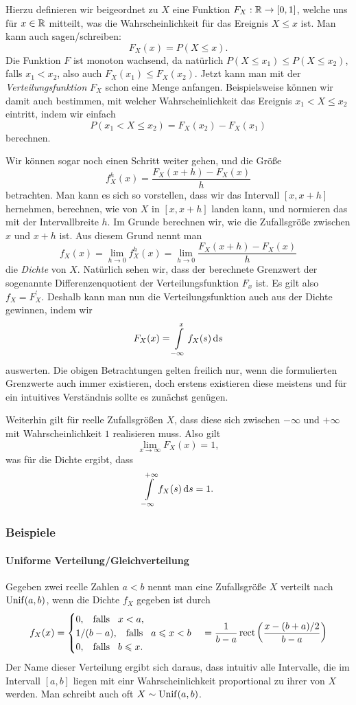 Hierzu definieren wir beigeordnet zu $X$ eine Funktion $F_X: \mathbb{R} \rightarrow [0,1]$, welche uns für $x \in \mathbb{R}$ mitteilt, was die Wahrscheinlichkeit für das Ereignis $X \leqslant x$ ist.
Man kann auch sagen/schreiben:
\[
F_X(x) = P(X \leqslant x).
\]
Die Funktion $F$ ist monoton wachsend, da natürlich $P(X \leqslant x_1) \leqslant P(X \leqslant x_2)$, falls $x_1 < x_2$, also auch $F_X(x_1) \leqslant F_X(x_2)$.
Jetzt kann man mit der \emph{Verteilungsfunktion} $F_X$ schon eine Menge anfangen.
Beispielsweise k\"onnen wir damit auch bestimmen, mit welcher Wahrscheinlichkeit das Ereignis $x_1 < X \leqslant x_2$ eintritt, indem wir einfach 
\[
P(x_1 < X \leqslant x_2) = F_X(x_2) - F_X(x_1)
\]
berechnen.

Wir k\"onnen sogar noch einen Schritt weiter gehen, und die Gr\"oße
\[
f^h_X(x) = \frac{F_X(x + h) - F_X(x)}{h}
\]
betrachten.
Man kann es sich so vorstellen, dass wir das Intervall $[x,x+h]$ hernehmen, berechnen, wie  von $X$ in $[x,x+h]$ landen kann, und normieren das mit der Intervallbreite $h$.
Im Grunde berechnen wir, wie  die Zufallsgr\"oße zwischen $x$ und $x+h$ ist.
Aus diesem Grund nennt man
\[
f_X(x) = \lim\limits_{h \rightarrow 0} f^h_X(x) = \lim\limits_{h \rightarrow 0} \frac{F_X(x + h) - F_X(x)}{h}
\]
die \emph{Dichte} von $X$.
Natürlich sehen wir, dass der berechnete Grenzwert der sogenannte Differenzenquotient der Verteilungsfunktion $F_x$ ist. Es gilt also $f_X = F^\prime_X$.
Deshalb kann man nun die Verteilungsfunktion auch aus der Dichte gewinnen, indem wir
\[
F_X(x) = {\int\limits_{-\infty}^{x}{f_X(s)}\,\mathrm{d}{s}}
\]
auswerten.
Die obigen Betrachtungen gelten freilich nur, wenn die formulierten Grenzwerte auch immer existieren, doch erstens existieren diese meistens und für ein intuitives Verständnis sollte es zunächst genügen.

Weiterhin gilt für reelle Zufallsgrößen $X$, dass diese sich  zwischen $-\infty$ und $+\infty$ mit Wahrscheinlichkeit $1$ realisieren muss.
Also gilt
\[
\lim_{x \rightarrow \infty} F_X(x) = 1,
\]
was für die Dichte ergibt, dass
\[
{\int\limits_{-\infty}^{+\infty}{f_X(s)}\,\mathrm{d}{s}} = 1.
\]
%
%
\subsubsection{Beispiele}
%
\paragraph{Uniforme Verteilung/Gleichverteilung}
Gegeben zwei reelle Zahlen $a < b$ nennt man eine Zufallsgröße $X$ verteilt nach $\operatorname*{Unif}(a,b)$, wenn die Dichte $f_X$ gegeben ist durch
\[
f_X(x) = \begin{cases}
    0, {\hspace{3mm} \text{falls} \hspace{3mm}} x<a, \\
    1/(b-a), {\hspace{3mm} \text{falls} \hspace{3mm}} a \leqslant x < b \\
    0, {\hspace{3mm} \text{falls} \hspace{3mm}} b \leqslant x.
\end{cases} = 
    \frac 1{b-a} \operatorname*{rect}\left(\frac{x-(b+a)/2}{b-a}\right)
\]
Der Name dieser Verteilung ergibt sich daraus, dass intuitiv alle Intervalle, die im Intervall $[a,b]$ liegen mit einr Wahrscheinlichkeit proportional zu ihrer  von $X$  werden.
Man schreibt auch oft $X \sim \operatorname*{Unif}(a,b)$.
%
